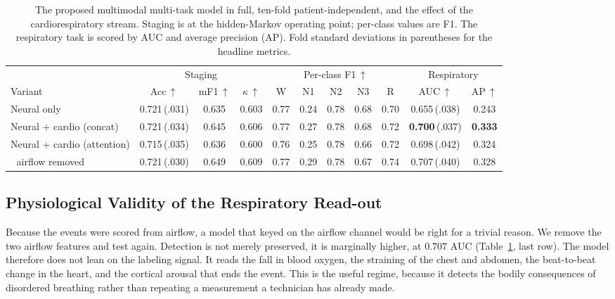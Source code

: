 \documentclass[journal]{IEEEtran}
\newcommand{\noflowAuc}{0.707}
\begin{document}
\begin{table}[t]
\caption{The proposed multimodal multi-task model in full, ten-fold patient-independent, and
the effect of the cardiorespiratory stream. Staging is at the hidden-Markov operating point;
per-class values are F1. The respiratory task is scored by AUC and average precision (AP).
Fold standard deviations in parentheses for the headline metrics.}
\label{tab:ablate}
\centering
\setlength{\tabcolsep}{5pt}
\begin{tabular}{lccc ccccc cc}
\toprule
 & \multicolumn{3}{c}{Staging} & \multicolumn{5}{c}{Per-class F1\,$\uparrow$} & \multicolumn{2}{c}{Respiratory}\\
\cmidrule(lr){2-4}\cmidrule(lr){5-9}\cmidrule(lr){10-11}
Variant & Acc\,$\uparrow$ & mF1\,$\uparrow$ & $\kappa$\,$\uparrow$ & W & N1 & N2 & N3 & R & AUC\,$\uparrow$ & AP\,$\uparrow$ \\
\midrule
Neural only              & 0.721\,(.031) & 0.635 & 0.603 & 0.77 & 0.24 & 0.78 & 0.68 & 0.70 & 0.655\,(.038) & 0.243 \\
Neural + cardio (concat) & 0.721\,(.034) & 0.645 & 0.606 & 0.77 & 0.27 & 0.78 & 0.68 & 0.72 & \textbf{0.700}\,(.037) & \textbf{0.333} \\
Neural + cardio (attention) & 0.715\,(.035) & 0.636 & 0.600 & 0.76 & 0.25 & 0.78 & 0.66 & 0.72 & 0.698\,(.042) & 0.324 \\
$\;$ airflow removed     & 0.721\,(.030) & 0.649 & 0.609 & 0.77 & 0.29 & 0.78 & 0.67 & 0.74 & 0.707\,(.040) & 0.328 \\
\bottomrule
\end{tabular}
\end{table}

\subsection{Physiological Validity of the Respiratory Read-out}
\label{sec:noflow}
Because the events were scored from airflow, a model that keyed on the airflow channel would
be right for a trivial reason. We remove the two airflow features and test again. Detection is
not merely preserved, it is marginally higher, at $\noflowAuc$ AUC (Table~\ref{tab:ablate},
last row). The model therefore does not lean on the labeling signal. It reads the fall in
blood oxygen, the straining of the chest and abdomen, the beat-to-beat change in the heart, and
the cortical arousal that ends the event. This is the useful regime, because it detects the
bodily consequences of disordered breathing rather than repeating a measurement a technician
has already made.
\end{document}
